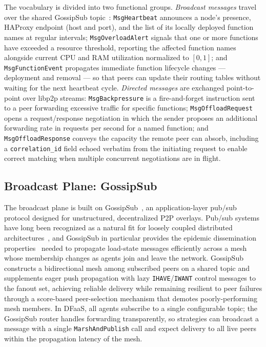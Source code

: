 The vocabulary is divided into two functional groups.
\emph{Broadcast messages} travel over the shared \ac{GossipSub} topic~\cite{vyzovitis2020gossipsub}:
\texttt{MsgHeartbeat} announces a node's presence, \ac{HAProxy} endpoint (host
and port), and the list of its locally deployed function names at regular
intervals;
\texttt{MsgOverloadAlert} signals that one or more functions have exceeded a
resource threshold, reporting the affected function names alongside current \ac{CPU}
and \ac{RAM} utilization normalized to $[0, 1]$;
and \texttt{MsgFunctionEvent} propagates immediate function lifecycle changes —
deployment and removal — so that peers can update their routing tables without
waiting for the next heartbeat cycle.
\emph{Directed messages} are exchanged point-to-point over libp2p streams:
\texttt{MsgBackpressure} is a fire-and-forget instruction sent to a peer
forwarding excessive traffic for specific functions;
\texttt{MsgOffloadRequest} opens a request/response negotiation in which the
sender proposes an additional forwarding rate in requests per second for a named
function;
and \texttt{MsgOffloadResponse} conveys the capacity the remote peer can absorb,
including a \texttt{correlation\_id} field echoed verbatim from the initiating
request to enable correct matching when multiple concurrent negotiations are in
flight.

\subsection{Broadcast Plane: GossipSub}
\label{subsec:broadcast}

The broadcast plane is built on \ac{GossipSub}~\cite{vyzovitis2020gossipsub},
an application-layer pub/sub protocol designed for unstructured, decentralized
\ac{P2P} overlays.
Pub/sub systems have long been recognized as a natural fit for loosely coupled
distributed architectures~\cite{eugster2003pubsub}, and \ac{GossipSub} in
particular provides the epidemic dissemination properties~\cite{kermarrec2007epidemic}
needed to propagate load-state messages efficiently across a mesh whose
membership changes as agents join and leave the network.
\ac{GossipSub} constructs a bidirectional mesh among subscribed peers on a
shared topic and supplements eager push propagation with lazy \texttt{IHAVE}/\texttt{IWANT}
control messages to the fanout set, achieving reliable delivery while remaining
resilient to peer failures through a score-based peer-selection mechanism that
demotes poorly-performing mesh members.
In \ac{DFaaS}, all agents subscribe to a single configurable topic; the
\ac{GossipSub} router handles forwarding transparently, so strategies can
broadcast a message with a single \texttt{MarshAndPublish} call and expect
delivery to all live peers within the propagation latency of the mesh.

